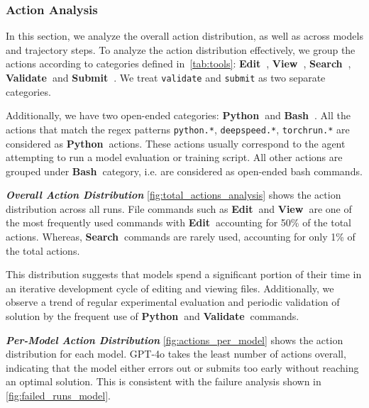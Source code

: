 \documentclass[]{fairmeta}
\newcommand{\ibold}[1]{\textbf{\textit{#1}}}
\newcommand{\hextext}[2]{\textcolor[HTML]{#1}{#2}}
\begin{document}
\subsubsection{Action Analysis}
\label{sec:action_analysis}

\newcommand{\editing}{\hextext{4477AA}{\textbf{Edit~}}}
\newcommand{\viewer}{\hextext{EE6677}{\textbf{View~}}}
\newcommand{\validate}{\hextext{228833}{\textbf{Validate~}}}
\newcommand{\submit}{\hextext{CCBB44}{\textbf{Submit~}}}
\newcommand{\search}{\hextext{66CCEE}{\textbf{Search~}}}
\newcommand{\python}{\hextext{AA3377}{\textbf{Python~}}}
\newcommand{\bash}{\hextext{BBBBBB}{\textbf{Bash~}}}



In this section, we analyze the overall action distribution, as well as across models and trajectory steps.
%
To analyze the action distribution effectively, we group the actions according to categories defined in~\autoref{tab:tools}: \editing, \viewer, \search, \validate and \submit.
%
We treat \texttt{validate} and \texttt{submit} as two separate categories.

Additionally, we have two open-ended categories: \python and \bash.
%
All the actions that match the regex patterns \texttt{python.*}, \texttt{deepspeed.*}, \texttt{torchrun.*} are considered as \python actions.
%
These actions usually correspond to the agent attempting to run a model evaluation or training script.
%
All other actions are grouped under \bash category, i.e. are considered as open-ended bash commands.


\ibold{Overall Action Distribution}
\autoref{fig:total_actions_analysis} shows the action distribution across all runs. 
%
File commands such as \editing and \viewer are one of the most frequently used commands with \editing accounting for 50\% of the total actions.
%
Whereas, \search commands are rarely used, accounting for only 1\% of the total actions.

This distribution suggests that models spend a significant portion of their time in an iterative development cycle of editing and viewing files.
%
Additionally, we observe a trend of regular experimental evaluation and periodic validation of solution by the frequent use of \python and \validate commands.

\ibold{Per-Model Action Distribution}
\autoref{fig:actions_per_model} shows the action distribution for each model.
%
GPT-4o takes the least number of actions overall, indicating that the model either errors out or submits too early without reaching an optimal solution.
%
This is consistent with the failure analysis shown in \autoref{fig:failed_runs_model}.
\end{document}
